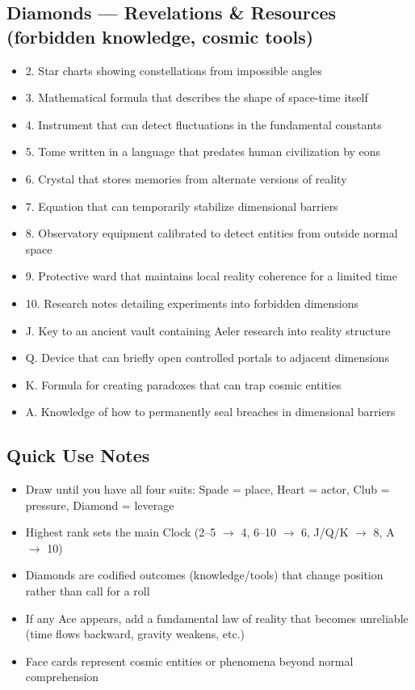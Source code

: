 \documentclass[11pt]{article}
\begin{document}
\subsection*{Diamonds — Revelations \& Resources (forbidden knowledge, cosmic tools)}
\begin{itemize}[leftmargin=*]
\item 2. Star charts showing constellations from impossible angles
\item 3. Mathematical formula that describes the shape of space-time itself
\item 4. Instrument that can detect fluctuations in the fundamental constants
\item 5. Tome written in a language that predates human civilization by eons
\item 6. Crystal that stores memories from alternate versions of reality
\item 7. Equation that can temporarily stabilize dimensional barriers
\item 8. Observatory equipment calibrated to detect entities from outside normal space
\item 9. Protective ward that maintains local reality coherence for a limited time
\item 10. Research notes detailing experiments into forbidden dimensions
\item J. Key to an ancient vault containing Aeler research into reality structure
\item Q. Device that can briefly open controlled portals to adjacent dimensions
\item K. Formula for creating paradoxes that can trap cosmic entities
\item A. Knowledge of how to permanently seal breaches in dimensional barriers
\end{itemize}

\subsection*{Quick Use Notes}
\begin{itemize}[leftmargin=*]
\item Draw until you have all four suits: Spade = place, Heart = actor, Club = pressure, Diamond = leverage
\item Highest rank sets the main Clock (2--5 $\rightarrow$ 4, 6--10 $\rightarrow$ 6, J/Q/K $\rightarrow$ 8, A $\rightarrow$ 10)
\item Diamonds are codified outcomes (knowledge/tools) that change position rather than call for a roll
\item If any Ace appears, add a fundamental law of reality that becomes unreliable (time flows backward, gravity weakens, etc.)
\item Face cards represent cosmic entities or phenomena beyond normal comprehension
\end{itemize}
\end{document}
